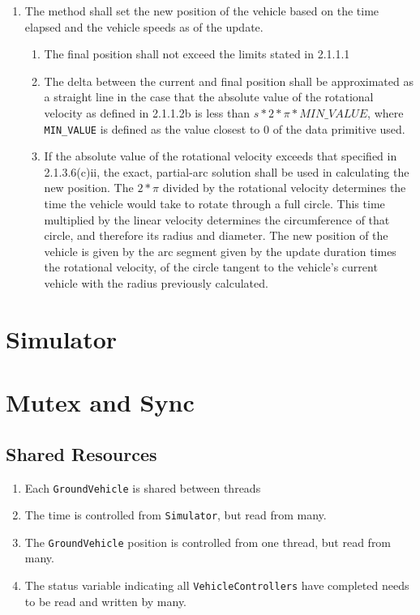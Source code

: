 \documentclass{article}
\begin{document}
\begin{enumerate}
\begin{enumerate}
		\item The method shall set the new position of the vehicle based on the time elapsed and the vehicle speeds as of the update.
		\begin{enumerate}
			\item The final position shall not exceed the limits stated in 2.1.1.1
			\item The delta between the current and final position shall be approximated as a straight line in the case that the absolute value of the rotational velocity as defined in 2.1.1.2b is less than $s*2*\pi*MIN\_VALUE$, where \verb|MIN_VALUE| is defined as the value closest to 0 of the data primitive used.
			\item If the absolute value of the rotational velocity exceeds that specified in 2.1.3.6(c)ii, the exact, partial-arc solution shall be used in calculating the new position.  The $2*\pi$ divided by the rotational velocity determines the time the vehicle would take to rotate through a full circle.  This time multiplied by the linear velocity determines the circumference of that circle, and therefore its radius and diameter.  The new position of the vehicle is given by the arc segment given by the update duration times the rotational velocity, of the circle tangent to the vehicle's current vehicle with the radius previously calculated.
		\end{enumerate}
	\end{enumerate}
\end{enumerate}

\section{Simulator}

\section{Mutex and Sync}
\subsection{Shared Resources}
\begin{enumerate}
	\item Each \verb|GroundVehicle| is shared between threads
	\item The time is controlled from \verb|Simulator|, but read from many.
	\item The \verb|GroundVehicle| position is controlled from one thread, but read from many.
	\item The status variable indicating all \verb|VehicleControllers| have completed needs to be read and written by many.
\end{enumerate}
\end{document}
